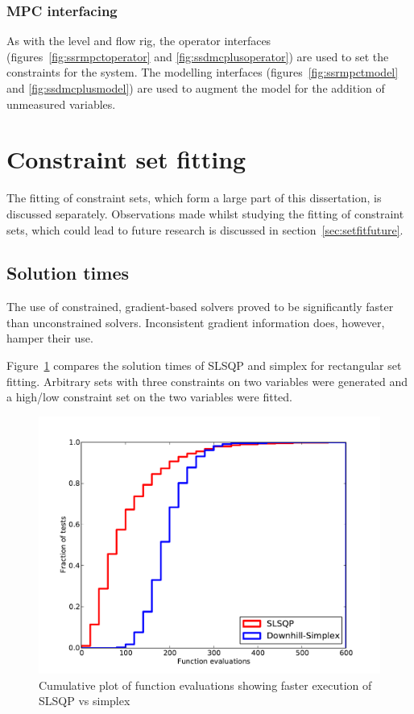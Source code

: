 \subsubsection{MPC interfacing}
As with the level and flow rig, the operator interfaces (figures~\ref{fig:ssrmpctoperator} and \ref{fig:ssdmcplusoperator}) are used to set the constraints for the system.
The modelling interfaces (figures~\ref{fig:ssrmpctmodel} and \ref{fig:ssdmcplusmodel}) are used to augment the model for the addition of unmeasured variables.

\section{Constraint set fitting}
The fitting of constraint sets, which form a large part of this dissertation, is discussed separately.
Observations made whilst studying the fitting of constraint sets, which could lead to future research is discussed in section~\ref{sec:setfitfuture}.

\subsection{Solution times}
The use of constrained, gradient-based solvers proved to be significantly faster than unconstrained solvers.
Inconsistent gradient information does, however, hamper their use.

Figure~\ref{fig:cubefittime} compares the solution times of SLSQP and simplex for rectangular set fitting.
Arbitrary sets with three constraints on two variables were generated and a high/low constraint set on the two variables were fitted.

\begin{figure}[htbp]
  \centering
    \includegraphics[width=\fullwidth]{graph/cubefittime}
  \caption[SLSQP and simplex calculation time comparison]{Cumulative plot of function evaluations showing faster execution of SLSQP vs simplex}
  \label{fig:cubefittime}
\end{figure}

